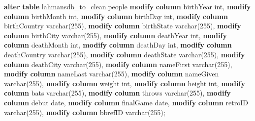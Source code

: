 \documentclass[11pt]{article}
\newenvironment{Shaded}{}{}
\newcommand{\KeywordTok}[1]{\textcolor[rgb]{0.00,0.44,0.13}{\textbf{{#1}}}}
\newcommand{\DataTypeTok}[1]{\textcolor[rgb]{0.56,0.13,0.00}{{#1}}}
\newcommand{\DecValTok}[1]{\textcolor[rgb]{0.25,0.63,0.44}{{#1}}}
\newcommand{\NormalTok}[1]{{#1}}
\begin{document}
    \begin{Shaded}
\begin{Highlighting}[]
\KeywordTok{alter} \KeywordTok{table}\NormalTok{ lahmansdb\_to\_clean.people}
    \KeywordTok{modify} \KeywordTok{column}\NormalTok{ birthYear }\DataTypeTok{int}\NormalTok{,}
    \KeywordTok{modify} \KeywordTok{column}\NormalTok{ birthMonth }\DataTypeTok{int}\NormalTok{,}
    \KeywordTok{modify} \KeywordTok{column}\NormalTok{ birthDay }\DataTypeTok{int}\NormalTok{,}
    \KeywordTok{modify} \KeywordTok{column}\NormalTok{ birthCountry }\DataTypeTok{varchar}\NormalTok{(}\DecValTok{255}\NormalTok{),}
    \KeywordTok{modify} \KeywordTok{column}\NormalTok{ birthState }\DataTypeTok{varchar}\NormalTok{(}\DecValTok{255}\NormalTok{),}
    \KeywordTok{modify} \KeywordTok{column}\NormalTok{ birthCity }\DataTypeTok{varchar}\NormalTok{(}\DecValTok{255}\NormalTok{),}
    \KeywordTok{modify} \KeywordTok{column}\NormalTok{ deathYear }\DataTypeTok{int}\NormalTok{,}
    \KeywordTok{modify} \KeywordTok{column}\NormalTok{ deathMonth }\DataTypeTok{int}\NormalTok{,}
    \KeywordTok{modify} \KeywordTok{column}\NormalTok{ deathDay }\DataTypeTok{int}\NormalTok{,}
    \KeywordTok{modify} \KeywordTok{column}\NormalTok{ deathCountry }\DataTypeTok{varchar}\NormalTok{(}\DecValTok{255}\NormalTok{),}
    \KeywordTok{modify} \KeywordTok{column}\NormalTok{ deathState }\DataTypeTok{varchar}\NormalTok{(}\DecValTok{255}\NormalTok{),}
    \KeywordTok{modify} \KeywordTok{column}\NormalTok{ deathCity }\DataTypeTok{varchar}\NormalTok{(}\DecValTok{255}\NormalTok{),}
    \KeywordTok{modify} \KeywordTok{column}\NormalTok{ nameFirst }\DataTypeTok{varchar}\NormalTok{(}\DecValTok{255}\NormalTok{),}
    \KeywordTok{modify} \KeywordTok{column}\NormalTok{ nameLast }\DataTypeTok{varchar}\NormalTok{(}\DecValTok{255}\NormalTok{),}
    \KeywordTok{modify} \KeywordTok{column}\NormalTok{ nameGiven }\DataTypeTok{varchar}\NormalTok{(}\DecValTok{255}\NormalTok{),}
    \KeywordTok{modify} \KeywordTok{column}\NormalTok{ weight }\DataTypeTok{int}\NormalTok{,}
    \KeywordTok{modify} \KeywordTok{column}\NormalTok{ height }\DataTypeTok{int}\NormalTok{,}
    \KeywordTok{modify} \KeywordTok{column}\NormalTok{ bats }\DataTypeTok{varchar}\NormalTok{(}\DecValTok{255}\NormalTok{),}
    \KeywordTok{modify} \KeywordTok{column}\NormalTok{ throws }\DataTypeTok{varchar}\NormalTok{(}\DecValTok{255}\NormalTok{),}
    \KeywordTok{modify} \KeywordTok{column}\NormalTok{ debut }\DataTypeTok{date}\NormalTok{,}
    \KeywordTok{modify} \KeywordTok{column}\NormalTok{ finalGame }\DataTypeTok{date}\NormalTok{,}
    \KeywordTok{modify} \KeywordTok{column}\NormalTok{ retroID }\DataTypeTok{varchar}\NormalTok{(}\DecValTok{255}\NormalTok{),}
    \KeywordTok{modify} \KeywordTok{column}\NormalTok{ bbrefID }\DataTypeTok{varchar}\NormalTok{(}\DecValTok{255}\NormalTok{);}
\end{Highlighting}
\end{Shaded}
\end{document}
